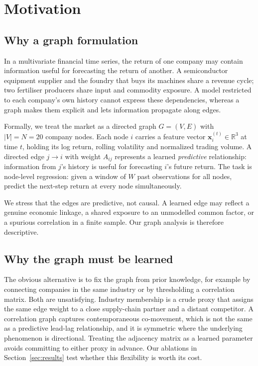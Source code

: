 \section{Motivation}
\label{sec:motivation}

\subsection{Why a graph formulation}

In a multivariate financial time series, the return of one company may contain information useful for forecasting the return of another. A semiconductor equipment supplier and the foundry that buys its machines share a revenue cycle; two fertiliser producers share input and commodity exposure. A model restricted to each company's own history cannot express these dependencies, whereas a graph makes them explicit and lets information propagate along edges.

Formally, we treat the market as a directed graph $G = (V, E)$ with $|V| = N = 20$ company nodes. Each node $i$ carries a feature vector $\mathbf{x}_i^{(t)} \in \mathbb{R}^{3}$ at time $t$, holding its log return, rolling volatility and normalized trading volume. A directed edge $j \rightarrow i$ with weight $A_{ij}$ represents a learned \emph{predictive} relationship: information from $j$'s history is useful for forecasting $i$'s future return. The task is node-level regression: given a window of $W$ past observations for all nodes, predict the next-step return at every node simultaneously.

We stress that the edges are predictive, not causal. A learned edge may reflect a genuine economic linkage, a shared exposure to an unmodelled common factor, or a spurious correlation in a finite sample. Our graph analysis is therefore descriptive.

\subsection{Why the graph must be learned}

The obvious alternative is to fix the graph from prior knowledge, for example by connecting companies in the same industry or by thresholding a correlation matrix. Both are unsatisfying. Industry membership is a crude proxy that assigns the same edge weight to a close supply-chain partner and a distant competitor. A correlation graph captures contemporaneous co-movement, which is not the same as a predictive lead-lag relationship, and it is symmetric where the underlying phenomenon is directional. Treating the adjacency matrix as a learned parameter avoids committing to either proxy in advance. Our ablations in Section~\ref{sec:results} test whether this flexibility is worth its cost.

